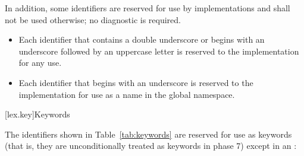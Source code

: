 \pnum
{}%
%
%
In addition, some identifiers are reserved for use by \Cpp
implementations and shall
not be used otherwise; no diagnostic is required.
\begin{itemize}
\item
Each identifier that contains a double underscore
\tcode{\unun}
%
or begins with an underscore followed by
an uppercase letter
%
is reserved to the implementation for any use.
\item
Each identifier that begins with an underscore is
%
reserved to the implementation for use as a name in the global namespace.%
\end{itemize}%

[lex.key]{Keywords}

\enlargethispage{\baselineskip}%
\pnum
{}%
The identifiers shown in Table~\ref{tab:keywords} are reserved for use
as keywords (that is, they are unconditionally treated as keywords in
phase 7) except in an :

